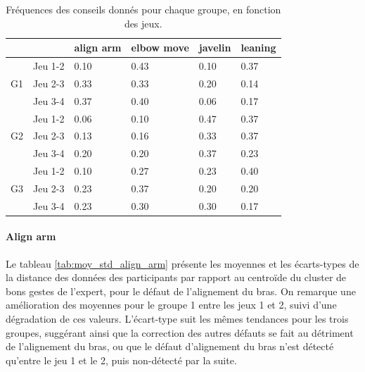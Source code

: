 \begin{table}%
\centering
\begin{tabular}{ll|llll}
                    &         & align arm & elbow move & javelin & leaning \\\hline
\multirow{3}{*}{G1} & Jeu 1-2 & 0.10      & 0.43       & 0.10    & 0.37    \\
                    & Jeu 2-3 & 0.33      & 0.33       & 0.20    & 0.14    \\
                    & Jeu 3-4 & 0.37      & 0.40       & 0.06    & 0.17    \\\hline
\multirow{3}{*}{G2} & Jeu 1-2 & 0.06      & 0.10       & 0.47    & 0.37    \\
                    & Jeu 2-3 & 0.13      & 0.16       & 0.33    & 0.37    \\
                    & Jeu 3-4 & 0.20      & 0.20       & 0.37    & 0.23    \\\hline
\multirow{3}{*}{G3} & Jeu 1-2 & 0.10      & 0.27       & 0.23    & 0.40    \\
                    & Jeu 2-3 & 0.23      & 0.37       & 0.20    & 0.20    \\
                    & Jeu 3-4 & 0.23      & 0.30       & 0.30    & 0.17
\end{tabular}
\caption{Fréquences des conseils donnés pour chaque groupe, en fonction des jeux.}
\label{tab:advices_groupes_freq}
\end{table}

\paragraph{Align arm}
Le tableau \ref{tab:moy_std_align_arm} présente les moyennes et les écarts-types de la distance des données des participants par rapport au centroïde du cluster de bons gestes de l'expert, pour le défaut de l'alignement du bras. On remarque une amélioration des moyennes pour le groupe 1 entre les jeux 1 et 2, suivi d'une dégradation de ces valeurs. L'écart-type suit les mêmes tendances pour les trois groupes, suggérant ainsi que la correction des autres défauts se fait au détriment de l'alignement du bras, ou que le défaut d'alignement du bras n'est détecté qu'entre le jeu 1 et le 2, puis non-détecté par la suite.

\begin{table}[H]
\small
{}
\caption{Moyennes et écarts-types des données des apprenants (alignement du bras).}
\label{tab:moy_std_align_arm}
\end{table}

